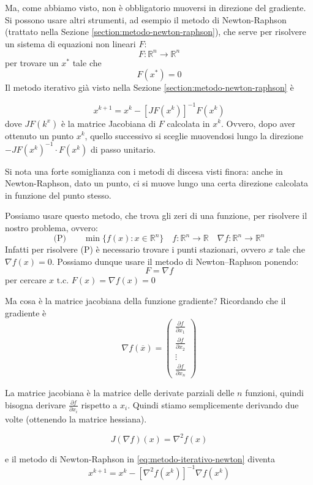 Ma, come abbiamo visto, non \`e obbligatorio muoversi in direzione del
gradiente. Si possono usare altri strumenti, ad esempio il metodo di
Newton-Raphson (trattato nella Sezione \ref{section:metodo-newton-raphson}),
che serve per risolvere un sistema di equazioni non lineari $F$:
$$ F:\mathbb{R}^{n} \rightarrow \mathbb{R}^n$$
per trovare un $x^*$ tale che
$$ F(x^*) =0$$
Il metodo iterativo gi\`a visto nella Sezione
\ref{section:metodo-newton-raphson} \`e

\begin{equation}
\label{eq:metodo-iterativo-newton} x^{k+1} = x^{k} - [JF(x^{k})]^{-1}
F(x^{k})
\end{equation} dove $JF(k^x)$ \`e la matrice Jacobiana di $F$ calcolata
in $x^k$. Ovvero, dopo aver ottenuto un punto $x^k$, quello successivo
si sceglie muovendosi lungo la direzione $-JF(x^k)^{-1}\cdot F(x^k)$
di passo unitario.

Si nota una forte somiglianza con i metodi di discesa visti finora:
anche in Newton-Raphson, dato un punto, ci si muove lungo una certa
direzione calcolata in funzione del punto stesso.

Possiamo usare questo metodo, che trova gli zeri di una funzione, per risolvere il
nostro problema, ovvero:
$$ \text{(P)}\qquad \min\{f(x): x \in \mathbb{R}^{n} \} \quad f: \mathbb{R}^{n} \rightarrow \mathbb{R} \quad \nabla f: \mathbb{R}^{n} \rightarrow \mathbb{R}^{n}$$
Infatti per risolvere (P) è necessario trovare i punti stazionari, ovvero $x$ tale che $ \nabla f(x) = 0$. Possiamo dunque usare il metodo di Newton--Raphson ponendo:
$$ F = \nabla f$$
per cercare $x \text{ t.c. } F(x) = \nabla f(x) = 0$

Ma cosa \`e la matrice jacobiana della funzione gradiente? Ricordando
che il gradiente \`e
$$\nabla f(\overline{x}) = \left(
\begin{array}{c}\frac{\partial f}{\partial x_1}\\ \frac{\partial
f}{\partial x_2}\\ \vdots\\ \frac{\partial f}{\partial x_n}
\end{array} \right)$$

La matrice jacobiana \`e la matrice delle derivate parziali delle $n$
funzioni, quindi bisogna derivare $\frac{\partial f}{\partial x_i}$
rispetto a $x_i$. Quindi stiamo semplicemente derivando due volte
(ottenendo la matrice hessiana).

$$J(\nabla f)(x) = \nabla^{2} f(x) $$

e il metodo di Newton-Raphson in \ref{eq:metodo-iterativo-newton}
diventa
$$ x^{k+1} = x^{k} - [ \nabla^{2}f(x^{k})]^{-1} \nabla f(x^{k})$$

